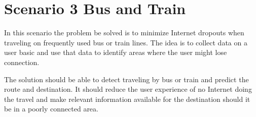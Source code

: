 \section{Scenario 3 Bus and Train}
In this scenario the problem be solved is to minimize Internet dropouts when traveling on frequently used bus or train lines. The idea is to collect data on a user basic and use that data to identify areas where the user might lose connection.

The solution should be able to detect traveling by bus or train and predict the route and destination. It should reduce the user experience of no Internet doing the travel and make relevant information available for the destination should it be in a poorly connected area.

